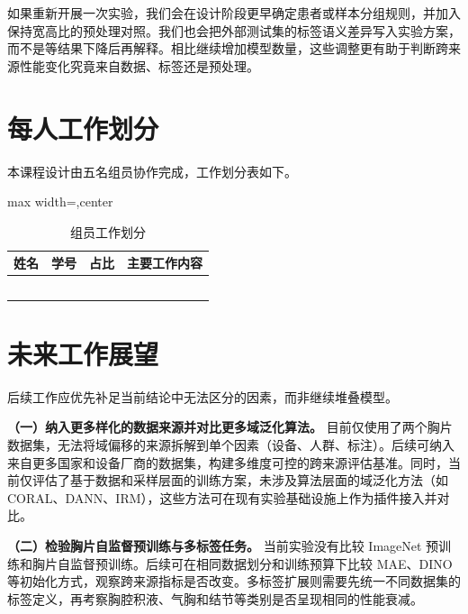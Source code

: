 \documentclass[12pt,a4paper,UTF8,openany]{ctexbook}
\begin{document}
如果重新开展一次实验，我们会在设计阶段更早确定患者或样本分组规则，并加入保持宽高比的预处理对照。我们也会把外部测试集的标签语义差异写入实验方案，而不是等结果下降后再解释。相比继续增加模型数量，这些调整更有助于判断跨来源性能变化究竟来自数据、标签还是预处理。

\section{每人工作划分}

本课程设计由五名组员协作完成，工作划分表如下。

\begin{table}[htbp]
\centering
\caption{组员工作划分}
\label{tab:workload}
\renewcommand{\arraystretch}{1.8}
\begin{adjustbox}{max width=\textwidth,center}
\begin{tabular}{cccp{7.2cm}}
\toprule
\textbf{姓名} & \textbf{学号} & \textbf{占比} & \textbf{主要工作内容} \\
\midrule
\rule{0pt}{1.2cm} & & & \\
\midrule
\rule{0pt}{1.2cm} & & & \\
\midrule
\rule{0pt}{1.2cm} & & & \\
\midrule
\rule{0pt}{1.2cm} & & & \\
\midrule
\rule{0pt}{1.2cm} & & & \\
\bottomrule
\end{tabular}
\end{adjustbox}
\end{table}

\section{未来工作展望}

后续工作应优先补足当前结论中无法区分的因素，而非继续堆叠模型。

\textbf{（一）纳入更多样化的数据来源并对比更多域泛化算法。} 目前仅使用了两个胸片数据集，无法将域偏移的来源拆解到单个因素（设备、人群、标注）。后续可纳入来自更多国家和设备厂商的数据集，构建多维度可控的跨来源评估基准。同时，当前仅评估了基于数据和采样层面的训练方案，未涉及算法层面的域泛化方法（如 CORAL、DANN、IRM），这些方法可在现有实验基础设施上作为插件接入并对比。

\textbf{（二）检验胸片自监督预训练与多标签任务。} 当前实验没有比较 ImageNet 预训练和胸片自监督预训练。后续可在相同数据划分和训练预算下比较 MAE、DINO 等初始化方式，观察跨来源指标是否改变。多标签扩展则需要先统一不同数据集的标签定义，再考察胸腔积液、气胸和结节等类别是否呈现相同的性能衰减。
\end{document}
